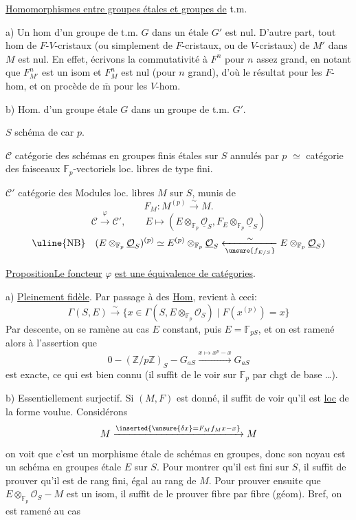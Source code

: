 \uline{Homomorphismes entre groupes étales et groupes de} t.m.

a) Un hom d'un groupe de t.m. $G$ dans un étale $G'$ est nul.
D'autre part, tout  hom  de
$F$-$V$-cristaux (ou simplement de $F$-cristaux, ou de $V$-cristaux)
de $M'$ dans $M$ est nul.
En effet, écrivons la commutativité à $F^n$ pour $n$ assez grand,
en notant que $F_{M'}^n$ est un isom et $F_M^n$ est nul
(pour $n$ grand), d'où  le résultat pour les $F$-hom,
et on procède de $\overline{\mathrm m}$ pour les $V$-hom.

b) Hom. d'un groupe étale $G$ dans un groupe de t.m. $G'$.

$S$ schéma de car $p$.

$\mathcal C$ catégorie des schémas en groupes finis étales
 sur $S$ annulés par $p$
$\simeq$ catégorie des faisceaux 
$\mathbb F_p$-vectoriels loc. libres de type fini.

$\mathcal C'$ catégorie des Modules loc. libres $M$ sur $S$, munis de
\[
F_M:M^{(p)}\xrightarrow{\sim}M.
\]
\[
\mathcal C\xrightarrow{\varphi}\mathcal C',
\qquad E\longmapsto
(E\otimes_{\mathbb F_p}\underline{\mathcal O}_S,
F_E\otimes_{\mathbb F_p}\underline{\mathcal O}_S)
\]
\[
\uline{\text{NB}}\quad
(E\otimes_{\mathbb F_p}\underline{\mathcal O}_S)^{(p)}
\simeq E^{(p)}\otimes_{\mathbb F_p}\underline{\mathcal O}_S
\xleftarrow[\unsure{f_{E/S}}]{\sim}
E\otimes_{\mathbb F_p}\underline{\mathcal O}_S)
\]

\uline{Proposition}\quad \uline{Le foncteur} $\varphi$
\uline{est une équivalence de catégories}.

a) \uline{Pleinement fidèle}. 
Par passage à des \uline{Hom}, revient à ceci:
\[
\Gamma(S,E)\xrightarrow{\sim}
\{x\in\Gamma(S,E\otimes_{\mathbb F_p}\mathcal O_S)
\mid F(x^{(p)})=x\}
\]
Par descente, on se ramène au cas $E$ constant, puis
$E=\mathbb F_{pS}$, et on est ramené alors à l'assertion que
\[
0-(\mathbb Z/p\mathbb Z)_S-G_{aS}
\xrightarrow{x\mapsto x^p-x}G_{aS}
\]
est exacte, ce qui est bien connu (il suffit de le voir sur
$\mathbb F_p$ par chgt de base \dots).

b) Essentiellement surjectif. Si $(M,F)$ est donné, il suffit
de voir qu'il est \uline{loc} de la forme voulue.
Considérons
\[
M\xrightarrow{\inserted{\unsure{\delta x}=F_Mf_Mx-x}}M
\]
on voit que c'est un morphisme étale de
schémas en groupes, donc son noyau est un schéma en groupes étale
$E$ sur $S$. Pour montrer qu'il est fini sur $S$, il suffit de
prouver qu'il est de rang
  
fini, égal au rang de $M$. Pour prouver ensuite que
$E\otimes_{\mathbb F_p}\mathcal O_S-M$ est un isom, il suffit de
le prouver fibre par fibre (géom). Bref, on est ramené au cas

